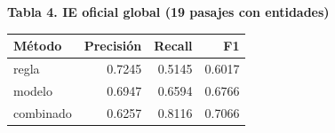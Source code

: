 \par\medskip\noindent\begin{minipage}{\linewidth}
\textbf{Tabla 4. IE oficial global (19 pasajes con entidades)}\par\smallskip
\begin{tabularx}{\linewidth}{@{}Yrrr@{}}\toprule
Método & Precisión & Recall & F1 \\ \midrule
regla & 0.7245 & 0.5145 & 0.6017 \\
modelo & 0.6947 & 0.6594 & 0.6766 \\
combinado & 0.6257 & 0.8116 & 0.7066 \\
\bottomrule\end{tabularx}\end{minipage}\par\medskip
